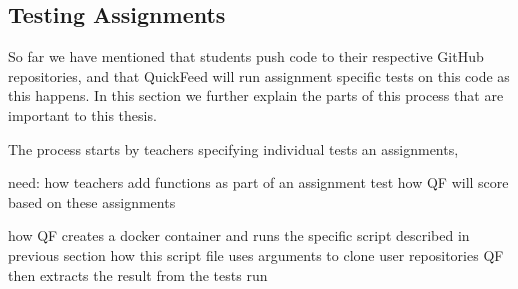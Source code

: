 \subsection{Testing Assignments}

So far we have mentioned that students push code to their respective GitHub repositories, and that QuickFeed will run assignment specific tests on this code as this happens.
In this section we further explain the parts of this process that are important to this thesis.

The process starts by teachers specifying individual tests an assignments, 

need:
how teachers add functions as part of an assignment test
how QF will score based on these assignments

how QF creates a docker container and runs the specific script described in previous section
how this script file uses arguments to clone user repositories
QF then extracts the result from the tests run